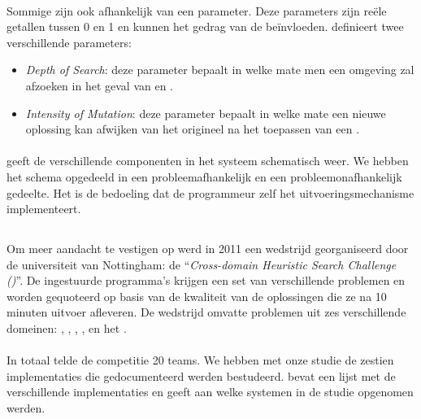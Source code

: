 \paragraph{}
Sommige \abllhn{} zijn ook afhankelijk van een parameter. Deze parameters zijn re\"ele getallen tussen 0 en 1 en kunnen het gedrag van de \abllh{} be\"invloeden. \abhf{} definieert twee verschillende parameters:
\begin{itemize}
 \item \emph{Depth of Search}: deze parameter bepaalt in welke mate men een omgeving zal afzoeken in het geval van \abrr{} en \abls{}.
 \item \emph{Intensity of Mutation}: deze parameter bepaalt in welke mate een nieuwe oplossing kan afwijken van het origineel na het toepassen van een \abmt{}.
\end{itemize}


\paragraph{}
 geeft de verschillende componenten in het \abhf{} systeem schematisch weer. We hebben het schema opgedeeld in een probleemafhankelijk en een probleemonafhankelijk gedeelte. Het is de bedoeling dat de programmeur zelf het uitvoeringsmechanisme implementeert.


\subsection{\abchescy{}}

Om meer aandacht te vestigen op \abhf{} werd in 2011 een wedstrijd georganiseerd door de universiteit van Nottingham: de ``\emph{Cross-domain Heuristic Search Challenge (\abchescy)}''\cite{Burke:2011:CHS:2177360.2177415}. De ingestuurde programma's krijgen een set van verschillende problemen en worden gequoteerd op basis van de kwaliteit van de oplossingen die ze na 10 minuten uitvoer afleveren. De wedstrijd omvatte problemen uit zes verschillende domeinen: , , , ,  en het .

\paragraph{}
In totaal telde de competitie 20 teams. We hebben met onze studie de zestien implementaties die gedocumenteerd werden bestudeerd.  bevat een lijst met de verschillende implementaties en geeft aan welke systemen in de studie opgenomen werden.

